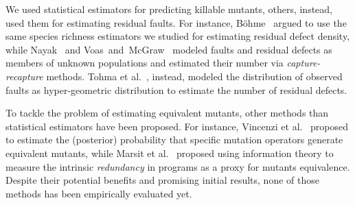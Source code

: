\documentclass[sigconf,review,anonymous]{acmart}
\newcounter{todocounter}
\newcommand{\todo}[1]{\marginpar{$|$}\textcolor{red}{\stepcounter{todocounter}\footnote[\thetodocounter]{\textcolor{red}{\textbf{TODO }}\textit{#1}}}}
\renewcommand{\todo}[1]{}
\begin{document}
We used statistical estimators for predicting killable mutants, others, instead, used
them for estimating residual faults.
%
For instance, B{\"o}hme~\cite{bohme2018stads} argued to use the same
species richness estimators we studied for estimating residual defect density,
while Nayak~\cite{nayak1988estimating} and Voas~and~McGraw~\cite{voas1997software}
modeled faults and 
residual defects as members of unknown populations
and estimated their number via \emph{capture-recapture} methods.
%
%
%
%
Tohma et al.~\cite{tohma1989structural}, instead, modeled
the distribution of observed faults as hyper-geometric distribution
to estimate the number of residual defects.

To tackle the problem of estimating equivalent mutants, other methods 
than statistical estimators have been proposed.
%
For instance, Vincenzi et al.~\cite{vincenzi2002bayesian} proposed to 
estimate the (posterior) probability that specific mutation operators
generate equivalent mutants, while
%
Marsit et al.~\cite{marsit2017estimating,marsit2018impact,ayad2019estimating}
proposed using information theory %
to measure the intrinsic \emph{redundancy} in programs as a proxy for mutants equivalence. 
Despite their potential benefits and promising initial results,
none of those methods has been empirically evaluated yet.

\end{document}
